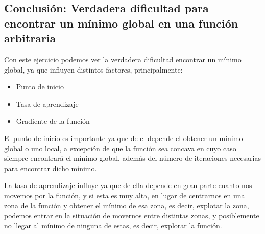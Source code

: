 \documentclass[12pt, spanish]{article}
\begin{document}
\begin{table}[H]

\end{table}

\subsection{Conclusión: Verdadera dificultad para encontrar un mínimo global en una función arbitraria}

Con este ejercicio podemos ver la verdadera dificultad encontrar un mínimo global, ya que influyen distintos factores, principalmente: 


\begin{itemize}
	\item Punto de inicio
	\item Tasa de aprendizaje
	\item Gradiente de la función
\end{itemize}

El punto de inicio es importante ya que de el depende el obtener un mínimo global o uno local, a excepción de que la función sea concava en cuyo caso siempre encontrará el mínimo global, además del número de iteraciones necesarias para encontrar dicho mínimo.

La tasa de aprendizaje influye ya que de ella depende en gran parte cuanto nos movemos por la función, y si esta es muy alta, en lugar de centrarnos en una zona de la función y obtener el mínimo de esa zona, es decir, explotar la zona, podemos entrar en la situación de movernos entre distintas zonas, y posiblemente no llegar al mínimo de ninguna de estas, es decir, explorar la función.
\end{document}
